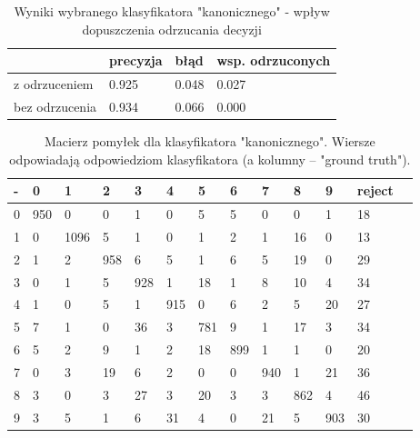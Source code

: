 \documentclass[a4paper]{article}
\begin{document}
\begin{table}[H]
    \caption{Wyniki wybranego klasyfikatora "kanonicznego" - wpływ dopuszczenia odrzucania decyzji
    \label{table:noReject}
    }
\begin{center}
    \begin{tabular}{| l | l | l | l |}
    \hline
        & precyzja & błąd & wsp. odrzuconych \\
    \hline
        z odrzuceniem  & 0.925 & 0.048 & 0.027 \\
        bez odrzucenia & 0.934 & 0.066 &  0.000 \\

    \hline
    \end{tabular}
\end{center}
\end{table}


\begin{table}[H]
    \caption{Macierz pomyłek dla klasyfikatora "kanonicznego".
    Wiersze odpowiadają odpowiedziom klasyfikatora (a kolumny -- "ground truth").
    \label{table:confusion}
    }
\begin{center}
    \begin{tabular}{| l | l | l | l | l | l | l | l | l | l | l | l | l |}
    \hline
        - & 0 & 1 & 2 & 3 & 4 & 5 & 6 & 7 & 8 & 9 & reject\\
    \hline
        0 & 950 &     0&      0&      1&      0&      5&      5&      0&      0&      1&     18 \\
        1 & 0   &  1096&      5&      1&      0&      1&      2&      1&     16&      0&     13 \\
        2 & 1   &     2&    958&      6&      5&      1&      6&      5&     19&      0&     29 \\
        3 & 0   &     1&      5&    928&      1&     18&      1&      8&     10&      4&     34 \\
        4 & 1   &     0&      5&      1&    915&      0&      6&      2&      5&     20&     27 \\
        5 & 7   &     1&      0&     36&      3&    781&      9&      1&     17&      3&     34 \\
        6 & 5   &     2&      9&      1&      2&     18&    899&      1&      1&      0&     20 \\
        7 & 0   &     3&     19&      6&      2&      0&      0&    940&      1&     21&     36 \\
        8 & 3   &     0&      3&     27&      3&     20&      3&      3&    862&      4&     46 \\
        9 & 3   &     5&      1&      6&     31&      4&      0&     21&      5&    903&     30 \\

    \hline
    \end{tabular}
\end{center}
\end{table}
\end{document}
